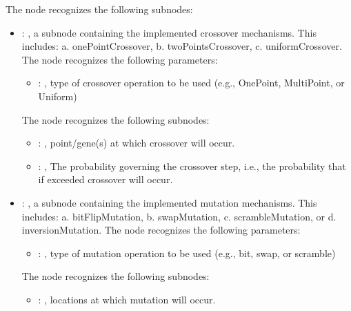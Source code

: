 \begin{itemize}
\begin{itemize}
          The  node recognizes the following subnodes:
          \begin{itemize}
            \item {}: , 
              a subnode containing the implemented crossover mechanisms.                   This
              includes: a.    onePointCrossover,                                  b.
              twoPointsCrossover,                                  c.    uniformCrossover.
              The  node recognizes the following parameters:
                \begin{itemize}
                  \item {}: , 
                    type of crossover operation to be used (e.g., OnePoint, MultiPoint, or Uniform)
              \end{itemize}

              The  node recognizes the following subnodes:
              \begin{itemize}
                \item {}: , 
                  point/gene(s) at which crossover will occur.

                \item {}: , 
                  The probability governing the crossover step, i.e., the probability that if
                  exceeded crossover will occur.
              \end{itemize}

            \item {}: , 
              a subnode containing the implemented mutation mechanisms.                   This
              includes: a.    bitFlipMutation,                                  b.    swapMutation,
              c.    scrambleMutation, or                                  d.    inversionMutation.
              The  node recognizes the following parameters:
                \begin{itemize}
                  \item {}: , 
                    type of mutation operation to be used (e.g., bit, swap, or scramble)
              \end{itemize}

              The  node recognizes the following subnodes:
              \begin{itemize}
                \item {}: , 
                  locations at which mutation will occur.


\end{itemize}
\end{itemize}
\end{itemize}
\end{itemize}
